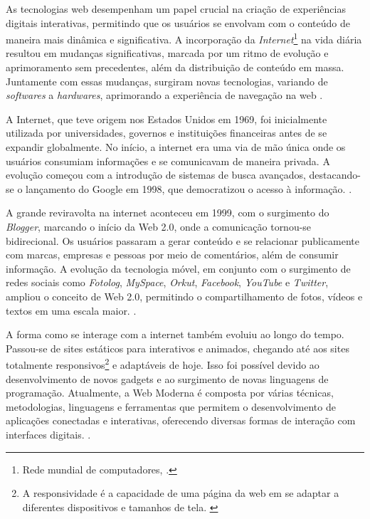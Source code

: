 As tecnologias
\acrshort{web}
desempenham um papel crucial na criação de experiências
digitais interativas, permitindo que os usuários se envolvam com o conteúdo de maneira mais
dinâmica e significativa. A incorporação da
\textit{Internet}\footnote{Rede mundial de computadores, \cite{marco-civil-art-2}.
}
na vida diária resultou em mudanças
significativas, marcada por um ritmo de evolução e aprimoramento sem precedentes, além da
distribuição de conteúdo em massa. Juntamente com essas mudanças, surgiram novas
tecnologias, variando de
\textit{softwares}
a
\textit{hardwares},
aprimorando a experiência de navegação na
\acrshort{web}
\cite{molgado}.

A Internet, que teve origem nos Estados Unidos em 1969, foi inicialmente utilizada
por universidades, governos e instituições financeiras antes de se expandir globalmente. No
início, a internet era uma via de mão única onde os usuários consumiam informações e se
comunicavam de maneira privada. A evolução começou com a introdução de sistemas de
busca avançados, destacando-se o lançamento do Google em 1998, que democratizou o
acesso à informação.
\cite{vitoriano}.

A grande reviravolta na internet aconteceu em 1999, com o surgimento do
\textit{Blogger},
marcando o início da
Web
2.0, onde a comunicação tornou-se bidirecional. Os usuários
passaram a gerar conteúdo e se relacionar publicamente com marcas, empresas e pessoas por
meio de comentários, além de consumir informação. A evolução da tecnologia móvel, em
conjunto com o surgimento de redes sociais como
\textit{Fotolog},
\textit{MySpace},
\textit{Orkut},
\textit{Facebook},
\textit{YouTube}
e
\textit{Twitter},
ampliou o conceito de Web 2.0, permitindo o compartilhamento de fotos,
vídeos e textos em uma escala maior.
\cite{vitoriano}.

A forma como se interage com a internet também evoluiu ao longo do tempo.
Passou-se de sites estáticos para interativos e animados, chegando até aos sites totalmente
responsivos\footnote{A responsividade é a capacidade de uma página da
    \acrshort{web}
    em se adaptar a diferentes dispositivos e tamanhos de tela.
    \cite{responsivo}
}
e adaptáveis de hoje. Isso foi possível devido ao desenvolvimento de novos
gadgets e ao surgimento de novas linguagens de programação. Atualmente, a Web Moderna é
composta por várias técnicas, metodologias, linguagens e ferramentas que permitem o
desenvolvimento de aplicações conectadas e interativas, oferecendo diversas formas de
interação com interfaces digitais.
\cite{vitoriano}.

